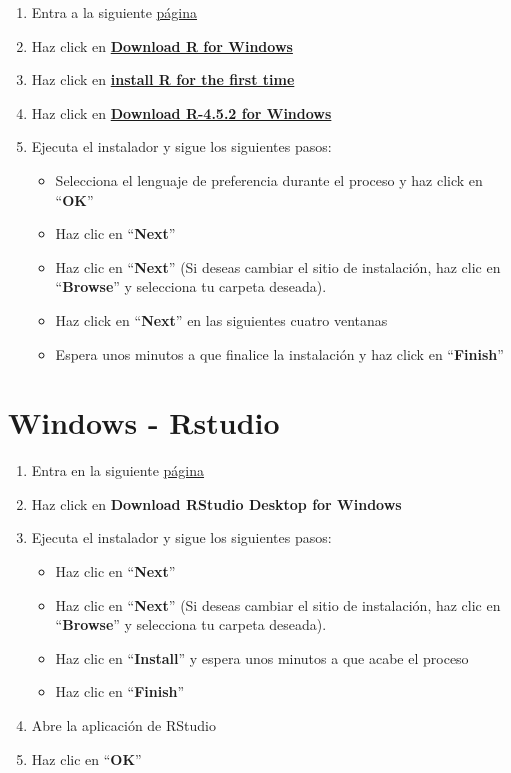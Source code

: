 \documentclass[
  spanish,
  12pt,
  letterpaper,
  DIV=11,
  numbers=noendperiod]{scrreprt}
\providecommand{\tightlist}{%
  \setlength{\itemsep}{0pt}\setlength{\parskip}{0pt}}
\begin{document}
\begin{enumerate}
\def\labelenumi{\arabic{enumi}.}
\item
  Entra a la siguiente \href{https://cloud.r-project.org/}{página}
\item
  Haz click en \ul{\textbf{Download R for Windows}}
\item
  Haz click en \ul{\textbf{install R for the first time}}
\item
  Haz click en \ul{\textbf{Download R-4.5.2 for Windows}}
\item
  Ejecuta el instalador y sigue los siguientes pasos:

  \begin{itemize}
  \item
    Selecciona el lenguaje de preferencia durante el proceso y haz click
    en ``\textbf{OK}''
  \item
    Haz clic en ``\textbf{Next}''
  \item
    Haz clic en ``\textbf{Next}'' (Si deseas cambiar el sitio de
    instalación, haz clic en ``\textbf{Browse}'' y selecciona tu carpeta
    deseada).
  \item
    Haz click en ``\textbf{Next}'' en las siguientes cuatro ventanas
  \item
    Espera unos minutos a que finalice la instalación y haz click en
    ``\textbf{Finish}''
  \end{itemize}
\end{enumerate}

\section{Windows - Rstudio}\label{windows---rstudio}

\begin{enumerate}
\def\labelenumi{\arabic{enumi}.}
\tightlist
\item
  Entra en la siguiente
  \href{https://posit.co/download/rstudio-desktop/\#download}{página}
\item
  Haz click en \textbf{Download RStudio Desktop for Windows}
\item
  Ejecuta el instalador y sigue los siguientes pasos:

  \begin{itemize}
  \tightlist
  \item
    Haz clic en ``\textbf{Next}''
  \item
    Haz clic en ``\textbf{Next}'' (Si deseas cambiar el sitio de
    instalación, haz clic en ``\textbf{Browse}'' y selecciona tu carpeta
    deseada).
  \item
    Haz clic en ``\textbf{Install}'' y espera unos minutos a que acabe
    el proceso
  \item
    Haz clic en ``\textbf{Finish}''
  \end{itemize}
\item
  Abre la aplicación de RStudio
\item
  Haz clic en ``\textbf{OK}''
\end{enumerate}
\end{document}
